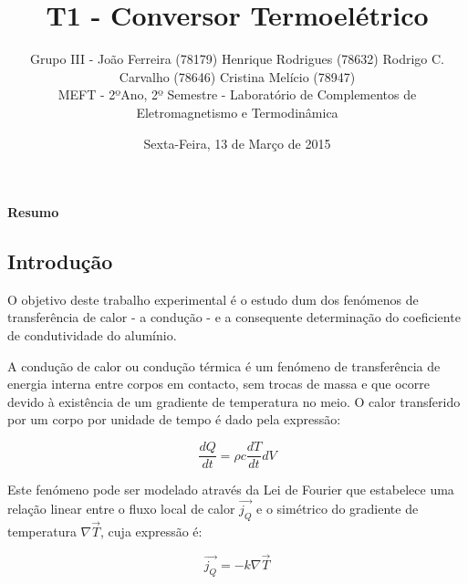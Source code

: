 \documentclass[9pt]{extarticle}
\renewenvironment{abstract}
 {\small
  \begin{center}
  \bfseries \abstractname\vspace{-.5em}\vspace{0pt}
  \end{center}
  \list{}{
    \setlength{\leftmargin}{0cm}%
    \setlength{\rightmargin}{\leftmargin}%
  }%
  \item\relax}
 {\endlist}
\renewcommand{\abstractname}{Resumo}
\begin{document}
\title {\bf \huge T1 - Conversor Termoelétrico}
\author
{{\small Grupo III - João Ferreira (78179) Henrique Rodrigues (78632) Rodrigo C. Carvalho (78646) Cristina Melício (78947)} \\
{\small MEFT - 2ºAno, 2º Semestre - Laboratório de Complementos de Eletromagnetismo e Termodinâmica}}
\date{{\small Sexta-Feira, 13 de Março de 2015}}
\maketitle

\begin{abstract}

\end{abstract}

\begin{multicols}{2}

\section{Introdução}

\par O objetivo deste trabalho experimental é o estudo dum dos fenómenos de transferência de calor - a condução - e a consequente determinação do coeficiente de condutividade do alumínio. 

\par A condução de calor ou condução térmica é um fenómeno de transferência de energia interna entre corpos em contacto, sem trocas de massa e que ocorre devido à existência de um gradiente de temperatura no meio. O calor transferido por um corpo por unidade de tempo é dado pela expressão:

\begin{equation} \label{calor}
\frac{dQ}{dt} = \rho c \frac{dT}{dt} dV
\end{equation}
\begin{center}
\par{}
\end{center}

Este fenómeno pode ser modelado através da Lei de Fourier que estabelece uma relação linear entre o fluxo local de calor $\vec{j_Q}$ e o simétrico do gradiente de temperatura $\nabla\vec{T}$, cuja expressão é:

\begin{equation}
\vec{j_Q} = - k \nabla\vec{T}
\end{equation}
\begin{center}
\par{}
\end{center}


\end{multicols}
\end{document}

